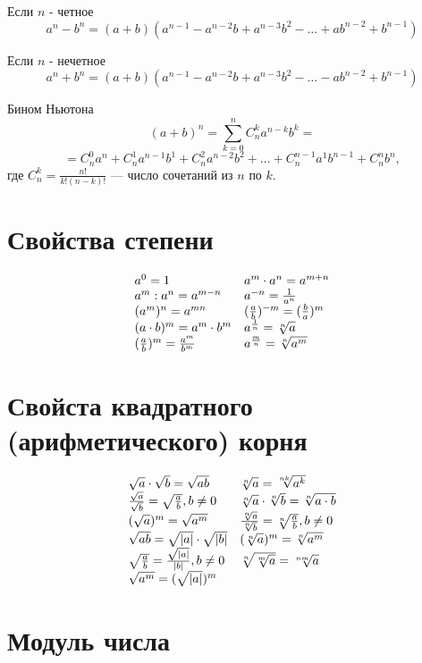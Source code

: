 \documentclass[a5paper, 8pt]{extarticle}
\begin{document}
Если $n$ - четное
$$a^n-b^n=(a+b)(a^{n-1}-a^{n-2}b+a^{n-3}b^2-\dots +ab^{n-2}+b^{n-1})$$

Если $n$ - нечетное
$$a^n+b^n=(a+b)(a^{n-1}-a^{n-2}b+a^{n-3}b^2-\dots -ab^{n-2}+b^{n-1})$$

Бином Ньютона
$$(a+b)^n=\sum\limits_{k=0}^n C_n^ka^{n-k}b^k=$$
$$=C_n^0a^n+C_n^1a^{n-1}b^1+C_n^2a^{n-2}b^2+\dots +C_n^{n-1}a^1b^{n-1}+C_n^nb^n,$$
где $C_n^k=\frac{n!}{k!(n-k)!}$ --- число сочетаний из $n$ по $k.$

\section{Свойства степени}

$$
\begin{array}{ll}
a^0=1  & a^m\cdot a^n=a^{m+n}\\
a^m: a^n=a^{m-n} & a^{-n}=\frac{1}{a^n}\\
(a^m)^n=a^{mn} & (\frac{a}{b})^{-m}=(\frac{b}{a})^{m}\\
(a\cdot b)^m=a^m\cdot b^m & a^{\frac{1}{n}}=\root{n}\of{a}\\
(\frac{a}{b})^m =\frac{a^m}{b^m} & a^{\frac{m}{n}}=\root{n}\of{a^m}\\
\end{array}
$$

\section{Свойста квадратного (арифметического) корня}

$$
\begin{array}{ll}
\sqrt{a}\cdot \sqrt{b} = \sqrt{ab}  & \root{n}\of{a}=\root{nk}\of{a^k} \\
\frac{\sqrt{a}}{\sqrt{b}}=\sqrt{\frac{a}{b}}, b\not= 0 & \root{n}\of{a}\cdot \root{n}\of{b}=\root{n}\of{a\cdot b}\\
(\sqrt{a})^m=\sqrt{a^m} & \frac{\root{n}\of{a}}{\root{n}\of{b}}=\root{n}\of{\frac{a}{b}}, b\not=0\\
\sqrt{ab}=\sqrt{|a|}\cdot \sqrt{|b|} & (\root{n}\of{a})^m = \root{n}\of{a^m}\\
\sqrt{\frac{a}{b}}=\frac{\sqrt{|a|}}{|b|}, b\not=0 & \root{n}\of{\root{m}\of{a}} = \root{nm}\of{a}\\
\sqrt{a^m}=(\sqrt{|a|})^m
\end{array}
$$

\section{Модуль числа}
\end{document}
